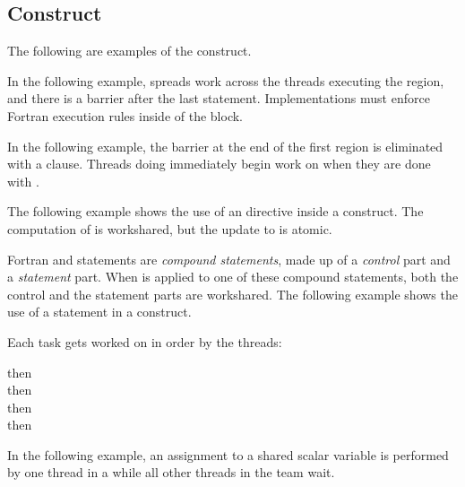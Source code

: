 \begin{fortranspecific}[4ex]
\section{ Construct}
\label{sec:workshare}

The following are examples of the  construct. 

In the following example,  spreads work across the threads executing 
the  region, and there is a barrier after the last statement. 
Implementations must enforce Fortran execution rules inside of the  
block.


In the following example, the barrier at the end of the first  
region is eliminated with a  clause. Threads doing  immediately begin work on  when they are done with .

\pagebreak
{}

The following example shows the use of an  directive inside a  
construct. The computation of  is workshared, but the update to 
 is atomic.


Fortran  and  statements are \emph{compound statements}, 
made up of a \emph{control} part and a \emph{statement} part. When  
is applied to one of these compound statements, both the control and the statement 
parts are workshared. The following example shows the use of a  statement 
in a  construct.

Each task gets worked on in order by the threads:

 then
\\
 then
\\
 then
\\
 then
\\


In the following example, an assignment to a shared scalar variable is performed 
by one thread in a  while all other threads in the team wait.


\end{fortranspecific}
